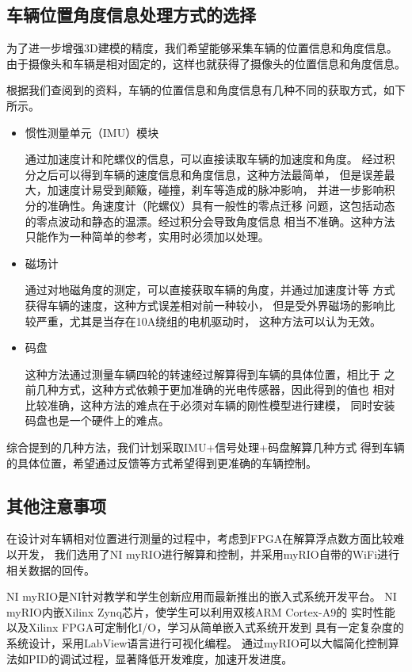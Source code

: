 \documentclass[a4paper]{paper}
\begin{document}
\subsection{车辆位置角度信息处理方式的选择}
为了进一步增强3D建模的精度，我们希望能够采集车辆的位置信息和角度信息。
由于摄像头和车辆是相对固定的，这样也就获得了摄像头的位置信息和角度信息。

根据我们查阅到的资料，车辆的位置信息和角度信息有几种不同的获取方式，如下所示。
\begin{itemize}
    \item 惯性测量单元（IMU）模块

    通过加速度计和陀螺仪的信息，可以直接读取车辆的加速度和角度。
    经过积分之后可以得到车辆的速度信息和角度信息，这种方法最简单，
    但是误差最大，加速度计易受到颠簸，碰撞，刹车等造成的脉冲影响，
    并进一步影响积分的准确性。角速度计（陀螺仪）具有一般性的零点迁移
    问题，这包括动态的零点波动和静态的温漂。经过积分会导致角度信息
    相当不准确。这种方法只能作为一种简单的参考，实用时必须加以处理。

    \item 磁场计

    通过对地磁角度的测定，可以直接获取车辆的角度，并通过加速度计等
    方式获得车辆的速度，这种方式误差相对前一种较小，
    但是受外界磁场的影响比较严重，尤其是当存在10A绕组的电机驱动时，
    这种方法可以认为无效。

    \item 码盘

    这种方法通过测量车辆四轮的转速经过解算得到车辆的具体位置，相比于
    之前几种方式，这种方式依赖于更加准确的光电传感器，因此得到的值也
    相对比较准确，这种方法的难点在于必须对车辆的刚性模型进行建模，
    同时安装码盘也是一个硬件上的难点。
\end{itemize}
综合提到的几种方法，我们计划采取IMU+信号处理+码盘解算几种方式
得到车辆的具体位置，希望通过反馈等方式希望得到更准确的车辆控制。

\subsection{其他注意事项}
在设计对车辆相对位置进行测量的过程中，考虑到FPGA在解算浮点数方面比较难以开发，
我们选用了NI myRIO进行解算和控制，并采用myRIO自带的WiFi进行相关数据的回传。

NI myRIO是NI针对教学和学生创新应用而最新推出的嵌入式系统开发平台。
NI myRIO内嵌Xilinx Zynq芯片，使学生可以利用双核ARM Cortex-A9的
实时性能以及Xilinx FPGA可定制化I/O，学习从简单嵌入式系统开发到
具有一定复杂度的系统设计，采用LabView语言进行可视化编程。
通过myRIO可以大幅简化控制算法如PID的调试过程，显著降低开发难度，加速开发进度。
\end{document}
